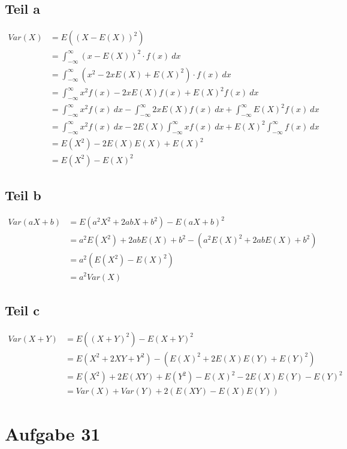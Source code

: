 \documentclass[10pt,a4paper]{article}
\begin{document}
\subsection{Teil a}
\begin{align*}
  Var(X) & = E((X - E(X))^{2})\\
  & = \int_{-\infty}^{\infty} (x - E(X))^{2} \cdot f(x)\ dx\\
  & = \int_{-\infty}^{\infty} (x^{2} - 2xE(X) + E(X)^{2}) \cdot f(x)\ dx\\
  & = \int_{-\infty}^{\infty} x^{2}f(x) - 2xE(X)f(x) + E(X)^{2}f(x)\ dx\\
  & = \int_{-\infty}^{\infty} x^{2}f(x)\ dx - \int_{-\infty}^{\infty} 2xE(X)f(x)\ dx + \int_{-\infty}^{\infty} E(X)^{2}f(x)\ dx\\
  & = \int_{-\infty}^{\infty} x^{2}f(x)\ dx - 2E(X) \int_{-\infty}^{\infty} xf(x)\ dx + E(X)^{2} \int_{-\infty}^{\infty} f(x)\ dx\\
  & = E(X^{2}) - 2E(X) E(X) + E(X)^{2}\\
  & = E(X^{2}) - E(X)^{2}
\end{align*}

\subsection{Teil b}
\begin{align*}
  Var(aX + b) & = E(a^{2}X^{2} + 2abX + b^{2}) - E(aX + b)^{2}\\
  & = a^{2} E(X^{2}) + 2abE(X) + b^{2} - \left( a^{2}E(X)^{2} + 2abE(X) + b^{2} \right)\\
  & = a^{2} (E(X^{2}) - E(X)^{2})\\
  & = a^{2} Var(X)
\end{align*}

\subsection{Teil c}
\begin{align*}
  Var(X + Y) & = E((X + Y)^{2}) - E(X + Y)^{2}\\
  & = E(X^{2} + 2XY + Y^{2}) - \left( E(X)^{2} + 2E(X)E(Y) + E(Y)^{2} \right)\\
  & = E(X^{2}) + 2E(XY) + E(Y^{2}) - E(X)^{2} - 2E(X)E(Y) - E(Y)^{2}\\
  & = Var(X) + Var(Y) + 2 \left( E(XY) - E(X)E(Y) \right)
\end{align*}

\section{Aufgabe 31}
\end{document}
